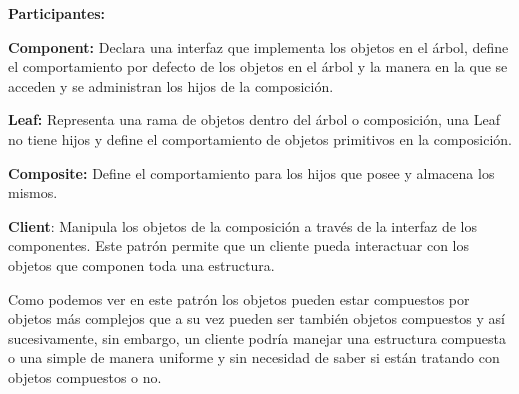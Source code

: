 \documentclass[12pt]{article}
\begin{document}
\begin{multicols}{2}

\par


\vspace{\baselineskip}
{\fontsize{9pt}{10.8pt}\selectfont \textbf{Participantes: }\par}\par


\vspace{\baselineskip}
{\fontsize{9pt}{10.8pt}\selectfont \textbf{Component:} Declara una interfaz que implementa los objetos en el árbol, define el comportamiento por defecto de los objetos en el árbol y la manera en la que se acceden y se administran los hijos de la composición. \par}\par


\vspace{\baselineskip}
{\fontsize{9pt}{10.8pt}\selectfont \textbf{Leaf:} Representa una rama de objetos dentro del árbol o composición, una Leaf no tiene hijos y define el comportamiento de objetos primitivos en la composición. \par}\par


\vspace{\baselineskip}
{\fontsize{9pt}{10.8pt}\selectfont \textbf{Composite:} Define el comportamiento para los hijos que posee y almacena los mismos. \par}\par


\vspace{\baselineskip}
{\fontsize{9pt}{10.8pt}\selectfont \textbf{Client}: Manipula los objetos de la composición a través de la interfaz de los componentes. Este patrón permite que un cliente pueda interactuar con los objetos que componen toda una estructura. \par}\par


\vspace{\baselineskip}
{\fontsize{9pt}{10.8pt}\selectfont Como podemos ver en este patrón los objetos pueden estar compuestos por objetos más complejos que a su vez pueden ser también objetos compuestos y así sucesivamente, sin embargo, un cliente podría manejar una estructura compuesta o una simple de manera uniforme y sin necesidad de saber si están tratando con objetos compuestos o no.\par}\par



\end{multicols}
\end{document}
